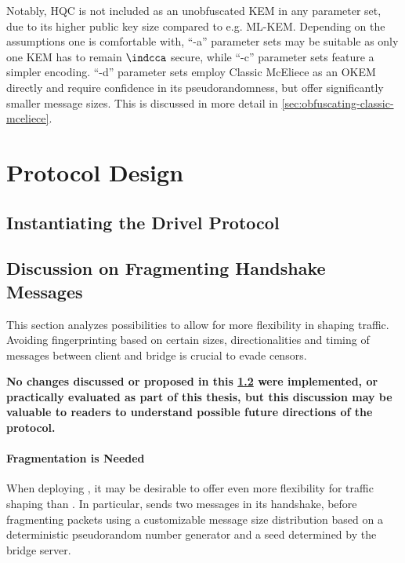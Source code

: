 Notably, HQC is not included as an unobfuscated KEM in any parameter set, due to its higher public key size compared to e.g. ML-KEM. Depending on the assumptions one is comfortable with, ``-a'' parameter sets may be suitable as only one KEM has to remain $\indcca$ secure, while ``-c'' parameter sets feature a simpler encoding. ``-d'' parameter sets employ Classic McEliece as an OKEM directly and require confidence in its pseudorandomness, but offer significantly smaller message sizes. This is discussed in more detail in \cref{sec:obfuscating-classic-mceliece}.

\section{Protocol Design} \label{sec:protocol-design}


\subsection{Instantiating the Drivel Protocol} \label{ssec:drivel-instance}


\subsection{Discussion on Fragmenting Handshake Messages} \label{ssec:fragmentation}

This section analyzes possibilities to allow for more flexibility in shaping \drivel{} traffic. Avoiding fingerprinting based on certain sizes, directionalities and timing of messages between client and bridge is crucial to evade censors.

\textbf{No changes discussed or proposed in this \cref{ssec:fragmentation} were implemented, or practically evaluated as part of this thesis, but this discussion may be valuable to readers to understand possible future directions of the protocol.}

\paragraph{Fragmentation is Needed}
When deploying \drivel{}, it may be desirable to offer even more flexibility for traffic shaping than \obfsfour{}. In particular, \obfsfour{} sends two messages in its handshake, before fragmenting packets using a customizable message size distribution based on a deterministic pseudorandom number generator and a seed determined by the bridge server.

